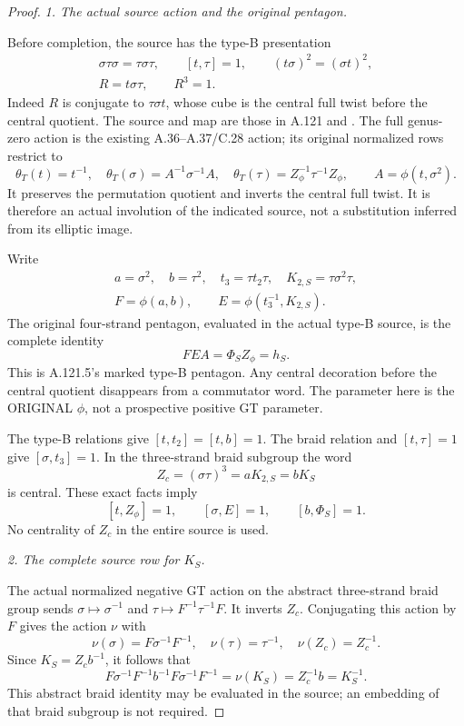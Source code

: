 \begin{proof}
\emph{1. The actual source action and the original pentagon.}\par
Before completion, the source has the type-B presentation
\[
 \begin{gathered}
 \sigma\tau\sigma=\tau\sigma\tau,
 \qquad [t,\tau]=1,
 \qquad (t\sigma)^2=(\sigma t)^2,\\
 R=t\sigma\tau,\qquad R^3=1.
 \end{gathered}
 \tag{A.135.10}
\]
Indeed \(R\) is conjugate to \(\tau\sigma t\), whose cube is the
central full twist before the central quotient. The source and map
are those in A.121 and \citep[Proposition~2.20(1)]{A_Enriquez2014}.
The full genus-zero action is the existing A.36--A.37/C.28 action;
its original normalized rows restrict to
\[
 \theta_T(t)=t^{-1},\quad
 \theta_T(\sigma)=A^{-1}\sigma^{-1}A,\quad
 \theta_T(\tau)=Z_\phi^{-1}\tau^{-1}Z_\phi,
 \qquad A=\phi(t,\sigma^2).
 \tag{A.135.11}
\]
It preserves the permutation quotient and inverts the central full
twist. It is therefore an actual involution of the indicated source,
not a substitution inferred from its elliptic image.

Write
\[
 \begin{gathered}
 a=\sigma^2,\quad b=\tau^2,\quad
 t_3=\tau t_2\tau,\quad K_{2,S}=\tau\sigma^2\tau,\\
 F=\phi(a,b),\qquad E=\phi(t_3^{-1},K_{2,S}).
 \end{gathered}
\]
The original four-strand pentagon, evaluated in the actual type-B
source, is the complete identity
\[
                         FEA=\Phi_S Z_\phi=h_S.
 \tag{A.135.12}
\]
This is A.121.5's marked type-B pentagon. Any central decoration
before the central quotient disappears from a commutator word.
The parameter here is the ORIGINAL \(\phi\), not a prospective
positive GT parameter.

The type-B relations give \([t,t_2]=[t,b]=1\). The braid relation
and \([t,\tau]=1\) give \([\sigma,t_3]=1\). In the three-strand
braid subgroup the word
\[
 Z_c=(\sigma\tau)^3=aK_{2,S}=bK_S
 \tag{A.135.13}
\]
is central. These exact facts imply
\[
 [t,Z_\phi]=1,\qquad [\sigma,E]=1,\qquad [b,\Phi_S]=1.
 \tag{A.135.14}
\]
No centrality of \(Z_c\) in the entire source is used.

\emph{2. The complete source row for \(K_S\).}\par
The actual normalized negative GT action on the abstract
three-strand braid group sends
\(\sigma\mapsto\sigma^{-1}\) and
\(\tau\mapsto F^{-1}\tau^{-1}F\). It inverts \(Z_c\).
Conjugating this action by \(F\) gives the action \(\nu\) with
\[
 \nu(\sigma)=F\sigma^{-1}F^{-1},\quad
 \nu(\tau)=\tau^{-1},\quad
 \nu(Z_c)=Z_c^{-1}.
\]
Since \(K_S=Z_cb^{-1}\), it follows that
\[
 F\sigma^{-1}F^{-1}b^{-1}F\sigma^{-1}F^{-1}
       =\nu(K_S)=Z_c^{-1}b=K_S^{-1}.
 \tag{A.135.15}
\]
This abstract braid identity may be evaluated in the source; an
embedding of that braid subgroup is not required.


\end{proof}
